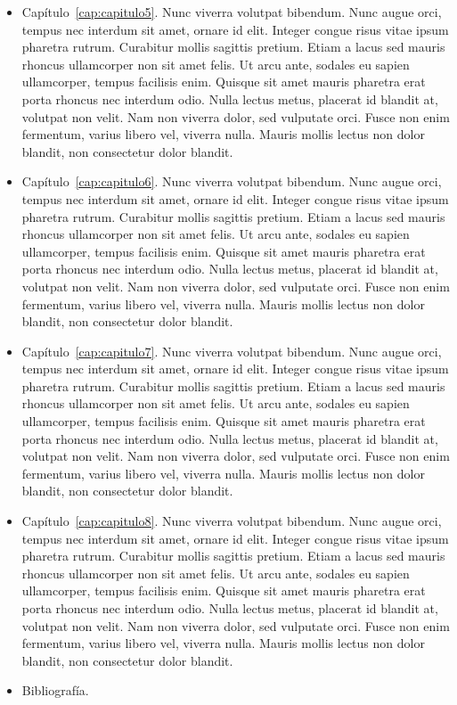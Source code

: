\begin{itemize}
	\item Capítulo~\ref{cap:capitulo5}. Nunc viverra volutpat bibendum. Nunc augue orci, tempus nec interdum sit amet, ornare id elit. Integer congue risus vitae ipsum pharetra rutrum. Curabitur mollis sagittis pretium. Etiam a lacus sed mauris rhoncus ullamcorper non sit amet felis. Ut arcu ante, sodales eu sapien ullamcorper, tempus facilisis enim. Quisque sit amet mauris pharetra erat porta rhoncus nec interdum odio. Nulla lectus metus, placerat id blandit at, volutpat non velit. Nam non viverra dolor, sed vulputate orci. Fusce non enim fermentum, varius libero vel, viverra nulla. Mauris mollis lectus non dolor blandit, non consectetur dolor blandit.
	\item Capítulo~\ref{cap:capitulo6}. Nunc viverra volutpat bibendum. Nunc augue orci, tempus nec interdum sit amet, ornare id elit. Integer congue risus vitae ipsum pharetra rutrum. Curabitur mollis sagittis pretium. Etiam a lacus sed mauris rhoncus ullamcorper non sit amet felis. Ut arcu ante, sodales eu sapien ullamcorper, tempus facilisis enim. Quisque sit amet mauris pharetra erat porta rhoncus nec interdum odio. Nulla lectus metus, placerat id blandit at, volutpat non velit. Nam non viverra dolor, sed vulputate orci. Fusce non enim fermentum, varius libero vel, viverra nulla. Mauris mollis lectus non dolor blandit, non consectetur dolor blandit.
	\item Capítulo~\ref{cap:capitulo7}. Nunc viverra volutpat bibendum. Nunc augue orci, tempus nec interdum sit amet, ornare id elit. Integer congue risus vitae ipsum pharetra rutrum. Curabitur mollis sagittis pretium. Etiam a lacus sed mauris rhoncus ullamcorper non sit amet felis. Ut arcu ante, sodales eu sapien ullamcorper, tempus facilisis enim. Quisque sit amet mauris pharetra erat porta rhoncus nec interdum odio. Nulla lectus metus, placerat id blandit at, volutpat non velit. Nam non viverra dolor, sed vulputate orci. Fusce non enim fermentum, varius libero vel, viverra nulla. Mauris mollis lectus non dolor blandit, non consectetur dolor blandit.
	\item Capítulo~\ref{cap:capitulo8}. Nunc viverra volutpat bibendum. Nunc augue orci, tempus nec interdum sit amet, ornare id elit. Integer congue risus vitae ipsum pharetra rutrum. Curabitur mollis sagittis pretium. Etiam a lacus sed mauris rhoncus ullamcorper non sit amet felis. Ut arcu ante, sodales eu sapien ullamcorper, tempus facilisis enim. Quisque sit amet mauris pharetra erat porta rhoncus nec interdum odio. Nulla lectus metus, placerat id blandit at, volutpat non velit. Nam non viverra dolor, sed vulputate orci. Fusce non enim fermentum, varius libero vel, viverra nulla. Mauris mollis lectus non dolor blandit, non consectetur dolor blandit.
	\item Bibliografía.
\end{itemize}
